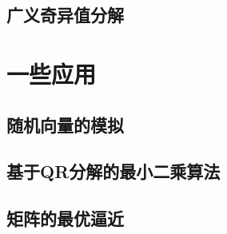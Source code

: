 \subsection{广义奇异值分解}
\label{sub:广义奇异值分解}

\section{一些应用}
\label{sec:一些应用}

\subsection{随机向量的模拟}
\label{sub:随机向量的模拟}

\subsection{基于QR分解的最小二乘算法}
\label{sub:基于QR分解的最小二乘算法}

\subsection{矩阵的最优逼近}
\label{sub:矩阵的最优逼近}


